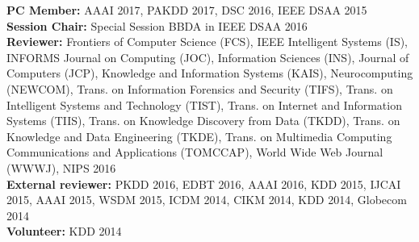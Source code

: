 \documentclass[margin, 10pt]{res}
\begin{document}
\begin{resume}
\textbf{PC Member:} AAAI 2017, PAKDD 2017, DSC 2016, IEEE DSAA 2015 \\
\textbf{Session Chair:} Special Session BBDA in IEEE DSAA 2016 \\
\textbf{Reviewer:}
Frontiers of Computer Science (FCS),
IEEE Intelligent Systems (IS),
INFORMS Journal on Computing (JOC),
Information Sciences (INS),
Journal of Computers (JCP),
Knowledge and Information Systems (KAIS),
Neurocomputing (NEWCOM),
Trans. on Information Forensics and Security (TIFS),
Trans. on Intelligent Systems and Technology (TIST),
Trans. on Internet and Information Systems (TIIS),
Trans. on Knowledge Discovery from Data (TKDD),
Trans. on Knowledge and Data Engineering (TKDE),
Trans. on Multimedia Computing Communications and Applications (TOMCCAP),
World Wide Web Journal (WWWJ), NIPS 2016 \\
\textbf{External reviewer:} PKDD 2016, EDBT 2016, AAAI 2016, KDD 2015, IJCAI 2015, AAAI 2015,
WSDM 2015, ICDM 2014, CIKM 2014, KDD 2014, Globecom 2014 \\
\textbf{Volunteer:} KDD 2014

\end{resume}
\end{document}
